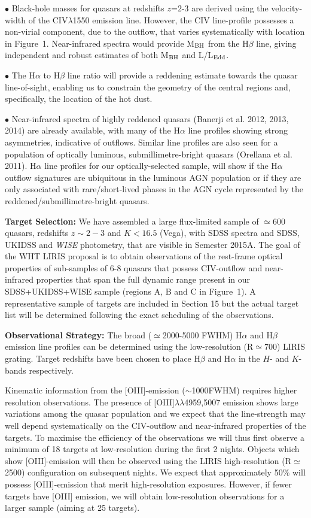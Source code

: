 $\bullet$ Black-hole masses for quasars at redshifts $z$=2-3 are
derived using the velocity-width of the CIV$\lambda$1550 emission
line. However, the CIV line-profile possesses a non-virial component,
due to the outflow, that varies systematically with location in
Figure~1.  Near-infrared spectra would provide M$_{\rm{BH}}$ from the
H$\beta$ line, giving independent and robust estimates of both
M$_{\rm{BH}}$ and L/L$_{\rm{Edd}}$.

$\bullet$ The H$\alpha$ to H$\beta$ line ratio will provide a reddening
estimate towards the quasar line-of-sight, enabling us to constrain
the geometry of the central regions and, specifically, the location of
the hot dust.

$\bullet$ Near-infrared spectra of highly reddened quasars (Banerji et
al. 2012, 2013, 2014) are already available, with many of the
H$\alpha$ line profiles showing strong asymmetries, indicative of
outflows. Similar line profiles are also seen for a population of
optically luminous, submillimetre-bright quasars (Orellana et
al. 2011). H$\alpha$ line profiles for our optically-selected sample,
will show if the H$\alpha$ outflow signatures are ubiquitous in the
luminous AGN population or if they are only associated with
rare/short-lived phases in the AGN cycle represented by the
reddened/submillimetre-bright quasars.

\textbf{Target Selection:} We have assembled a large flux-limited
sample of $\simeq$600 quasars, redshifts $z\sim2-3$ and $K<16.5$
(Vega), with SDSS spectra and SDSS, UKIDSS and \textit{WISE}
photometry, that are visible in Semester 2015A. The goal of the WHT
LIRIS proposal is to obtain observations of the rest-frame optical
properties of sub-samples of 6-8 quasars that possess
CIV-outflow and near-infrared properties that span the full dynamic
range present in our SDSS+UKIDSS+WISE sample (regions A, B and C in
Figure~1). A representative sample of targets are included in Section
15 but the actual target list will be determined following the exact
scheduling of the observations.

\textbf{Observational Strategy:} The broad ($\simeq$2000-5000\kms
FWHM) H$\alpha$ and H$\beta$ emission line profiles can be determined
using the low-resolution (R$\simeq$700) LIRIS grating. Target
redshifts have been chosen to place H$\beta$ and
H$\alpha$ in the $H$- and $K$-bands respectively.

Kinematic information from the [OIII]-emission ($\sim$1000\kms FWHM)
requires higher resolution observations.  The presence of
[OIII]$\lambda\lambda$4959,5007 emission shows large variations among
the quasar population and we expect that the line-strength may well
depend systematically on the CIV-outflow and near-infrared properties
of the targets. To maximise the efficiency of the observations we will
thus first observe a minimum of 18 targets at low-resolution during
the first 2 nights. Objects which show [OIII]-emission will then be
observed using the LIRIS high-resolution (R$\simeq$2500) configuration
on subsequent nights. We expect that approximately 50\% will possess
[OIII]-emission that merit high-resolution exposures. However, if
fewer targets have [OIII] emission, we will obtain low-resolution
observations for a larger sample (aiming at 25 targets).

